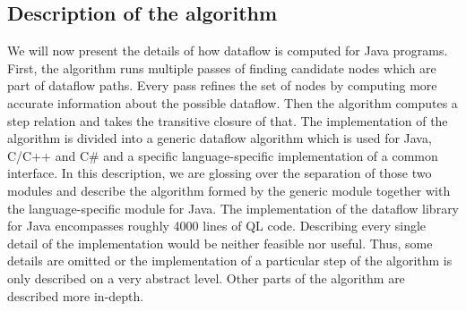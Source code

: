 \subsection{Description of the algorithm}
We will now present the details of how dataflow is computed for Java programs.
First, the algorithm runs multiple passes of finding candidate nodes which are part 
of dataflow paths.
Every pass refines the set of nodes by computing more accurate information about the 
possible dataflow.
Then the algorithm computes a step relation and takes the transitive closure of that.
The implementation of the algorithm is divided into a generic dataflow algorithm which is 
used for Java, C/C++ and C\# and a specific language-specific implementation of a common interface.
In this description, we are glossing over the separation of those two modules and 
describe the algorithm formed by the generic module together with the language-specific
module for Java.
The implementation of the dataflow library for Java encompasses roughly 4000 lines of
QL code. Describing every single detail of the implementation would be neither feasible nor 
useful. Thus, some details are omitted or the implementation of a particular step 
of the algorithm is only described on a very abstract level.
Other parts of the algorithm are described more in-depth.

